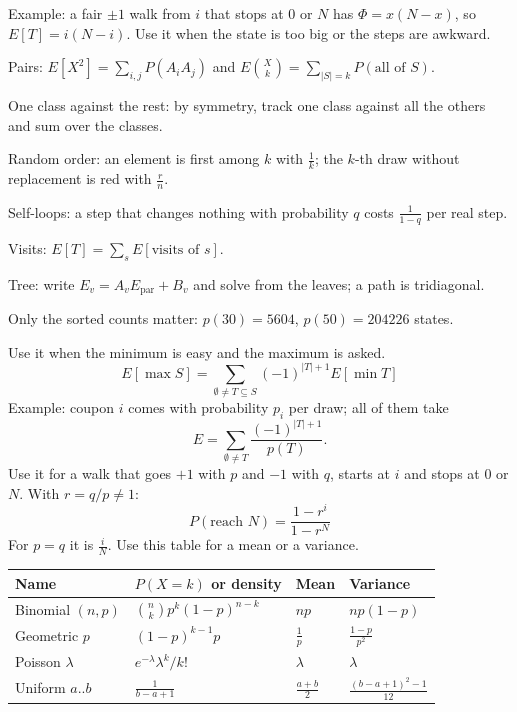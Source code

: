 {\begin{facts}
\end{facts}
Example: a fair $\pm 1$ walk from $i$ that stops at $0$ or $N$ has $\Phi = x(N - x)$, so $E[T] = i(N - i)$.
Use it when the state is too big or the steps are awkward.
\begin{facts}
	\item Pairs: $E[X^2] = \sum_{i,j} P(A_i A_j)$ and $E\binom{X}{k} = \sum_{|S| = k} P(\text{all of } S)$.
	\item One class against the rest: by symmetry, track one class against all the others and sum over the classes.
	\item Random order: an element is first among $k$ with $\frac{1}{k}$; the $k$-th draw without replacement is red with $\frac{r}{n}$.
	\item Self-loops: a step that changes nothing with probability $q$ costs $\frac{1}{1 - q}$ per real step.
	\item Visits: $E[T] = \sum_s E[\text{visits of } s]$.
	\item Tree: write $E_v = A_v E_{\mathrm{par}} + B_v$ and solve from the leaves; a path is tridiagonal.
	\item Only the sorted counts matter: $p(30) = 5604$, $p(50) = 204226$ states.
\end{facts}
Use it when the minimum is easy and the maximum is asked.
\[ E[\max S] = \sum_{\emptyset \ne T \subseteq S} (-1)^{|T| + 1} E[\min T] \]
Example: coupon $i$ comes with probability $p_i$ per draw; all of them take
\[ E = \sum_{\emptyset \ne T} \frac{(-1)^{|T| + 1}}{p(T)}. \]
Use it for a walk that goes $+1$ with $p$ and $-1$ with $q$, starts at $i$ and stops at $0$ or $N$. With $r = q / p \ne 1$:
\[ P(\text{reach } N) = \frac{1 - r^i}{1 - r^N} \]
For $p = q$ it is $\frac{i}{N}$.
Use this table for a mean or a variance.
\par\smallskip
\begin{tabular}{@{}p{2.6cm} p{3.0cm} l l@{}}
\toprule
Name & $P(X = k)$ or density & Mean & Variance \\
\midrule
Binomial $(n, p)$ & $\binom{n}{k} p^k (1 - p)^{n - k}$ & $np$ & $np(1 - p)$ \\
Geometric $p$ & $(1 - p)^{k - 1} p$ & $\frac{1}{p}$ & $\frac{1 - p}{p^2}$ \\
Poisson $\lambda$ & $e^{-\lambda} \lambda^k / k!$ & $\lambda$ & $\lambda$ \\
Uniform $a..b$ & $\frac{1}{b - a + 1}$ & $\frac{a + b}{2}$ & $\frac{(b - a + 1)^2 - 1}{12}$ \\

\end{tabular}}

